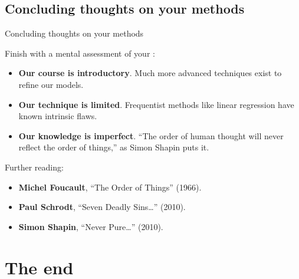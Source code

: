 \documentclass[t]{beamer}
\begin{document}
	\subsection{Concluding thoughts on your methods}

	\begin{frame}[t]{Concluding thoughts on your methods}
	
	Finish with a mental assessment of your :

		\begin{itemize}
			\item \textbf{Our course is introductory}. Much more advanced techniques exist to refine our models.
			
			\item \textbf{Our technique is limited}. Frequentist methods like linear regression have known intrinsic flaws.
			
			\item \textbf{Our knowledge is imperfect}. ``The order of human thought will never reflect the order of things,'' as Simon Shapin puts it.
		\end{itemize}
		
		Further reading:
		
		\begin{itemize}
			\item \textbf{Michel Foucault}, ``The Order of Things'' (1966).
			\item \textbf{Paul Schrodt}, ``Seven Deadly Sins…'' (2010).			 
			\item \textbf{Simon Shapin}, ``Never Pure…'' (2010).
		\end{itemize}
	
	\end{frame}
	
	\section{The end}
\end{document}
